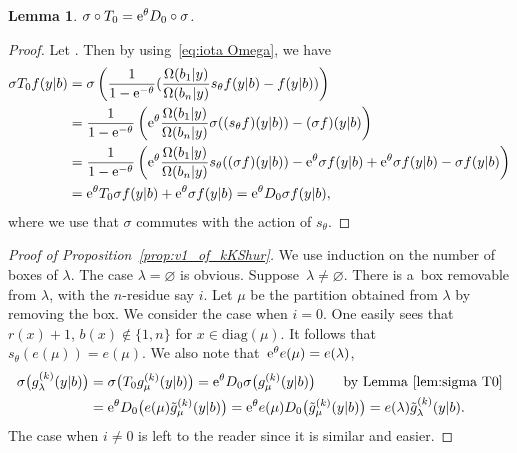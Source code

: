 \documentclass[10pt,a4paper]{amsart}
\numberwithin{equation}{section}
\newcommand{\la}{\lambda}
\newcommand{\Rep}{{R(T)}}
\newtheorem{Lemma}[Theorem]{Lemma}
\theoremstyle{definition}
\begin{document}
\begin{Lemma}\label{lem:sigma T0}
$\sigma \circ T_0={\rm e}^{\theta} D_0 \circ \sigma$.
\end{Lemma}
\begin{proof}
Let \smash{$f(y|b)\in \hat{\Lambda}^\Rep$}. Then
by using~\eqref{eq:iota Omega}, we have
\begin{align*}
\sigma T_0 f(y|b)
&=\sigma
\left(
\frac{1}{1-{\rm e}^{-\theta}}(\frac{\Omega(b_1|y)}{\Omega(b_n|y)}s_\theta f(y|b) -f(y|b))
\right)\\
&=
\frac{1}{1-{\rm e}^{-\theta}}\left({\rm e}^{\theta}\frac{\Omega(b_1|y)}{\Omega(b_n|y)} \sigma(( s_\theta f)(y| b)) -(\sigma f)(y|b)\right)\\
&=
\frac{1}{1-{\rm e}^{-\theta}}\left({\rm e}^{\theta}\frac{\Omega(b_1|y)}{\Omega(b_n|y)}s_\theta(( \sigma f)(y| b))-{\rm e}^{\theta} \sigma f(y| b) +{\rm e}^{\theta}\sigma f(y| b)-\sigma f(y|b)\right)\\
&={\rm e}^{\theta}
T_0\sigma f(y|b)
+{\rm e}^{\theta}\sigma f(y|b)={\rm e}^{\theta}
D_0\sigma f(y|b),
\end{align*}
where we use that $\sigma$ commutes with the action of $s_\theta$.
\end{proof}

\begin{proof}[Proof of Proposition~\ref{prop:v1_of_kKShur}]
We use induction on the number of boxes of $\la$. The case $\la=\varnothing$ is
obvious. Suppose~${\la\ne \varnothing}$.
There is a~box removable from $\la$, with the $n$-residue say $i$. Let $\mu$ be the partition obtained from $\la$ by removing the box.
We consider the case when $i=0$.
One easily sees that~${r(x)+1}$, $b(x)\notin\{1,n\}$ for $x\in \mathrm{diag}(\mu)$. It follows that $s_\theta (e(\mu))=e(\mu)$. We also note that~${{\rm e}^\theta e(\mu)=e(\lambda)}$,
\begin{align*}
\sigma\bigl(g^{(k)}_\lambda(y|b)\bigr)
&=\sigma\bigl(T_0 g^{(k)}_\mu(y|b)\bigr)={\rm e}^{\theta}{D}_0\sigma\bigl( g^{(k)}_\mu(y|b)\bigr)\qquad \text{by Lemma~\ref{lem:sigma T0}}\\
&={\rm e}^{\theta}{D}_0\bigl(e(\mu)\tilde{g}^{(k)}_\mu(y|b)\bigr)={\rm e}^{\theta}e(\mu){D}_0\bigl(\tilde{g}^{(k)}_\mu(y|b)\bigr)
=e(\lambda)\tilde{g}^{(k)}_\lambda(y|b).
\end{align*}
The case when $i\ne 0$ is
left to the reader since it is
similar and easier.
\end{proof}
\end{document}

